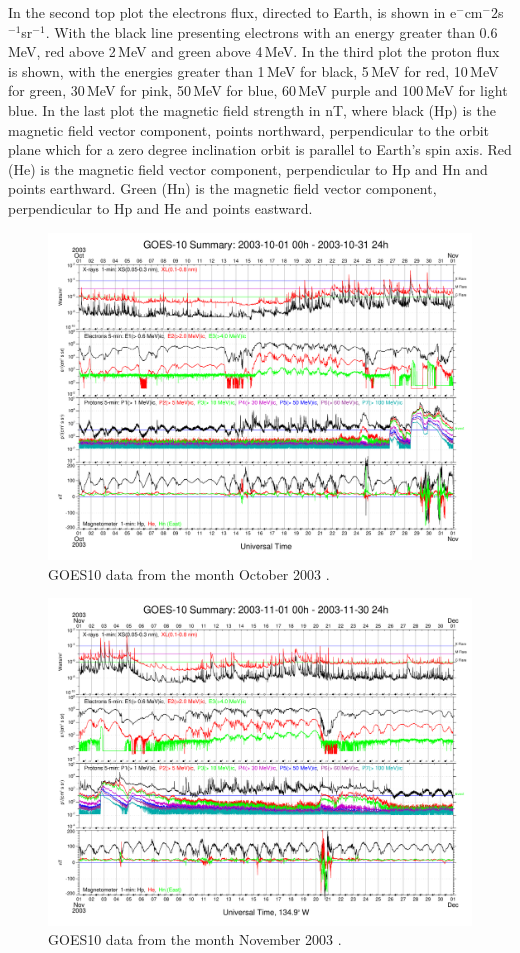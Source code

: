 In the second top plot the electrons flux, directed to Earth, is shown in e$^{-}$cm$^{-}2$s$^{-1}$sr$^{-1}$. With the black line presenting electrons with an energy greater than 0.6\,MeV, red above 2\,MeV and green above 4\,MeV. In the third plot the proton flux is shown, with the energies greater than 1\,MeV for black, 5\,MeV for red, 10\,MeV for green, 30\,MeV for pink, 50\,MeV for blue, 60\,MeV purple and 100\,MeV for light blue. In the last plot the magnetic field strength in nT, where black (Hp) is the magnetic field vector component, points northward, perpendicular to the orbit plane which for a zero degree inclination orbit is parallel to Earth's spin axis. Red (He) is the magnetic field vector component, perpendicular to Hp and Hn and points earthward. Green (Hn) is the magnetic field vector component, perpendicular to Hp and He and points eastward. \\


\begin{figure}[H]
\centering
\includegraphics[page=1, width=.79\textwidth]{figures/goes10_oct.pdf}

\caption{GOES10 data from the month October 2003 \cite{ngdc-noaa}.}
\label{fig:goes_sem_data_oct}
\end{figure}

\begin{figure}[H]
\centering
\includegraphics[page=1, width=.79\textwidth]{figures/goes10_nov.pdf}

\caption{GOES10 data from the month November 2003 \cite{ngdc-noaa}.}
\label{fig:goes_sem_data_nov}
\end{figure}

